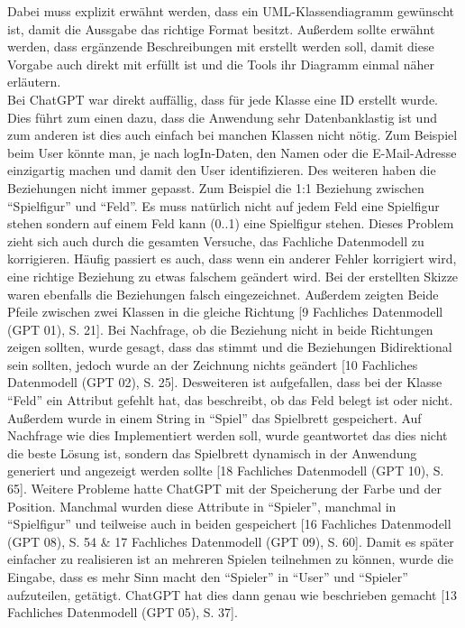 Dabei muss explizit erwähnt werden, dass ein UML-Klassendiagramm gewünscht ist, damit die Aussgabe das richtige Format besitzt. Außerdem sollte erwähnt werden,
dass ergänzende Beschreibungen mit erstellt werden soll, damit diese Vorgabe auch direkt mit erfüllt ist und die Tools ihr Diagramm einmal näher erläutern.\\

Bei ChatGPT war direkt auffällig, dass für jede Klasse eine ID erstellt wurde. Dies führt zum einen dazu, dass die Anwendung sehr Datenbanklastig ist und zum 
anderen ist dies auch einfach bei manchen Klassen nicht nötig. Zum Beispiel beim User könnte man, je nach logIn-Daten, den Namen oder die E-Mail-Adresse 
einzigartig machen und damit den User identifizieren. Des weiteren haben die Beziehungen nicht immer gepasst. Zum Beispiel die 1:1 Beziehung zwischen 
``Spielfigur'' und ``Feld''. Es muss natürlich nicht auf jedem Feld eine Spielfigur stehen sondern auf einem Feld kann (0..1) eine Spielfigur stehen. Dieses Problem
zieht sich auch durch die gesamten Versuche, das Fachliche Datenmodell zu korrigieren. Häufig passiert es auch, dass wenn ein anderer Fehler korrigiert wird, 
eine richtige Beziehung zu etwas falschem geändert wird. Bei der erstellten Skizze waren ebenfalls die Beziehungen falsch eingezeichnet. Außerdem zeigten Beide Pfeile 
zwischen zwei Klassen in die gleiche Richtung [9 Fachliches Datenmodell (GPT 01), S. 21]. Bei Nachfrage, ob die Beziehung nicht in beide Richtungen 
zeigen sollten, wurde gesagt, dass das stimmt und die Beziehungen Bidirektional sein sollten, jedoch wurde an der Zeichnung nichts geändert 
[10 Fachliches Datenmodell (GPT 02), S. 25]. Desweiteren ist aufgefallen, dass bei der Klasse ``Feld'' ein Attribut gefehlt
hat, das beschreibt, ob das Feld belegt ist oder nicht. Außerdem wurde in einem String in ``Spiel'' das Spielbrett gespeichert. Auf Nachfrage wie dies Implementiert
werden soll, wurde geantwortet das dies nicht die beste Lösung ist, sondern das Spielbrett dynamisch in der Anwendung generiert und angezeigt werden 
sollte [18 Fachliches Datenmodell (GPT 10), S. 65].
Weitere Probleme hatte ChatGPT mit der Speicherung der Farbe und der Position. Manchmal wurden diese Attribute in ``Spieler'', manchmal in ``Spielfigur'' und teilweise
auch in beiden gespeichert [16 Fachliches Datenmodell (GPT 08), S. 54 \& 17 Fachliches Datenmodell (GPT 09), S. 60]. 
Damit es später einfacher zu realisieren ist an mehreren Spielen teilnehmen zu können, wurde die Eingabe, dass es mehr Sinn macht den 
``Spieler'' in ``User'' und ``Spieler'' aufzuteilen, getätigt. ChatGPT hat dies dann genau wie beschrieben gemacht [13 Fachliches Datenmodell (GPT 05), S. 37]. 
